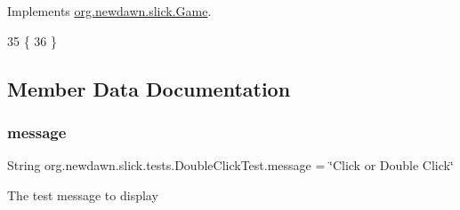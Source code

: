 Implements \mbox{\hyperlink{interfaceorg_1_1newdawn_1_1slick_1_1_game_ab07b2e9463ee4631620dde0de25bdee8}{org.\+newdawn.\+slick.\+Game}}.


\begin{DoxyCode}
35                                                                                  \{
36     \}
\end{DoxyCode}


\subsection{Member Data Documentation}
\mbox{\label{classorg_1_1newdawn_1_1slick_1_1tests_1_1_double_click_test_ab7f5f424e09fe1617e6d75e1cafb057e}} 
\subsubsection{\texorpdfstring{message}{message}}
{\footnotesize\ttfamily String org.\+newdawn.\+slick.\+tests.\+Double\+Click\+Test.\+message = \char`\"{}Click or Double Click\char`\"{}\hspace{0.3cm}{\ttfamily [private]}}

The test message to display 